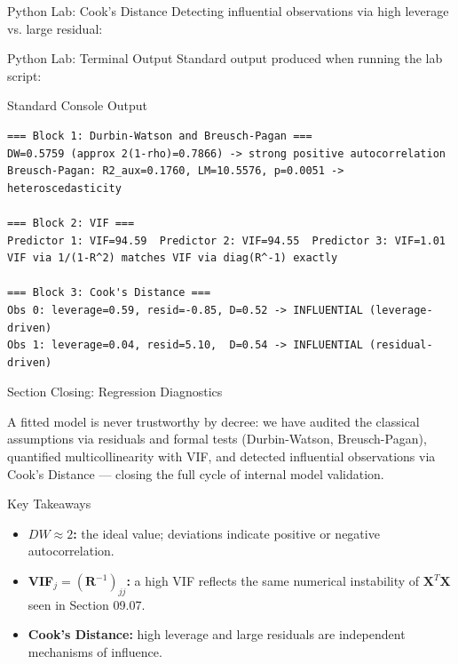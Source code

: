 \documentclass[10pt, aspectratio=169]{beamer}
\begin{document}
\begin{frame}[fragile]{Python Lab: Cook's Distance}
  \scriptsize
  Detecting influential observations via high leverage vs. large residual:
  {
  }
\end{frame}

\begin{frame}[fragile]{Python Lab: Terminal Output}
  \scriptsize
  Standard output produced when running the lab script:
  \vspace{0.02cm}
  \begin{block}{Standard Console Output}
    \fontsize{3.6pt}{4.3pt}\selectfont
    \begin{verbatim}
=== Block 1: Durbin-Watson and Breusch-Pagan ===
DW=0.5759 (approx 2(1-rho)=0.7866) -> strong positive autocorrelation
Breusch-Pagan: R2_aux=0.1760, LM=10.5576, p=0.0051 -> heteroscedasticity

=== Block 2: VIF ===
Predictor 1: VIF=94.59  Predictor 2: VIF=94.55  Predictor 3: VIF=1.01
VIF via 1/(1-R^2) matches VIF via diag(R^-1) exactly

=== Block 3: Cook's Distance ===
Obs 0: leverage=0.59, resid=-0.85, D=0.52 -> INFLUENTIAL (leverage-driven)
Obs 1: leverage=0.04, resid=5.10,  D=0.54 -> INFLUENTIAL (residual-driven)
    \end{verbatim}
  \end{block}
\end{frame}


\begin{frame}{Section Closing: Regression Diagnostics}
  \begin{reflexion}
    A fitted model is never trustworthy by decree: we have audited the classical assumptions via residuals and formal tests (Durbin-Watson, Breusch-Pagan), quantified multicollinearity with VIF, and detected influential observations via Cook's Distance --- closing the full cycle of internal model validation.
  \end{reflexion}

  \vspace{0.2cm}
  \pause
  \begin{block}{Key Takeaways}
    \begin{itemize}\itemsep=0.08cm
      \item \textbf{$DW\approx2$:} the ideal value; deviations indicate positive or negative autocorrelation.
      \item \textbf{VIF$_j=(\mathbf{R}^{-1})_{jj}$:} a high VIF reflects the same numerical instability of $\mathbf{X}^T\mathbf{X}$ seen in Section 09.07.
      \item \textbf{Cook's Distance:} high leverage and large residuals are independent mechanisms of influence.
    \end{itemize}
  \end{block}
\end{frame}
\end{document}
